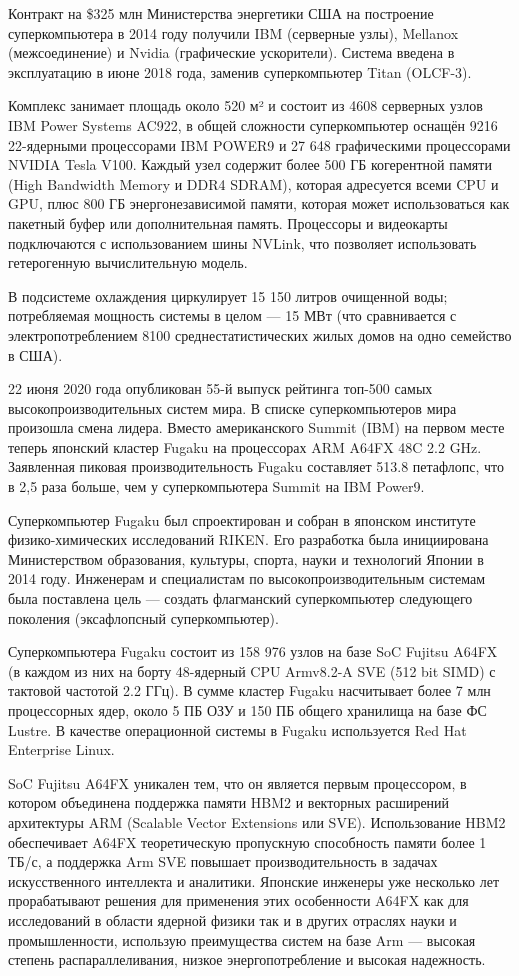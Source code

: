 Контракт на \$325 млн Министерства энергетики США на построение суперкомпьютера в 2014 году получили IBM (серверные узлы), Mellanox (межсоединение) и Nvidia (графические ускорители). Система введена в эксплуатацию в июне 2018 года, заменив суперкомпьютер Titan (OLCF-3).

Комплекс занимает площадь около 520 м² и состоит из 4608 серверных узлов IBM Power Systems AC922, в общей сложности суперкомпьютер оснащён 9216 22-ядерными процессорами IBM POWER9 и 27 648 графическими процессорами NVIDIA Tesla V100. Каждый узел содержит более 500 ГБ когерентной памяти (High Bandwidth Memory и DDR4 SDRAM), которая адресуется всеми CPU и GPU, плюс 800 ГБ энергонезависимой памяти, которая может использоваться как пакетный буфер или дополнительная память. Процессоры и видеокарты подключаются с использованием шины NVLink, что позволяет использовать гетерогенную вычислительную модель.

В подсистеме охлаждения циркулирует 15 150 литров очищенной воды; потребляемая мощность системы в целом — 15 МВт (что сравнивается с электропотреблением 8100 среднестатистических жилых домов на одно семейство в США). 

22 июня 2020 года опубликован 55-й выпуск рейтинга топ-500 самых высокопроизводительных систем мира. В списке суперкомпьютеров мира произошла смена лидера. Вместо американского Summit (IBM) на первом месте теперь японский кластер Fugaku на процессорах ARM A64FX 48C 2.2 GHz. Заявленная пиковая производительность Fugaku составляет 513.8 петафлопс, что в 2,5 раза больше, чем у суперкомпьютера Summit на IBM Power9.

Суперкомпьютер Fugaku был спроектирован и собран в японском институте физико-химических исследований RIKEN. Его разработка была инициирована Министерством образования, культуры, спорта, науки и технологий Японии в 2014 году. Инженерам и специалистам по высокопроизводительным системам была поставлена цель — создать флагманский суперкомпьютер следующего поколения (эксафлопсный суперкомпьютер).

Суперкомпьютера Fugaku состоит из 158 976 узлов на базе SoC Fujitsu A64FX (в каждом из них на борту 48-ядерный CPU Armv8.2-A SVE (512 bit SIMD) с тактовой частотой 2.2 ГГц). В сумме кластер Fugaku насчитывает более 7 млн процессорных ядер, около 5 ПБ ОЗУ и 150 ПБ общего хранилища на базе ФС Lustre. В качестве операционной системы в Fugaku используется Red Hat Enterprise Linux. 

SoC Fujitsu A64FX уникален тем, что он является первым процессором, в котором объединена поддержка памяти HBM2 и векторных расширений архитектуры ARM (Scalable Vector Extensions или SVE). Использование HBM2 обеспечивает A64FX теоретическую пропускную способность памяти более 1 ТБ/с, а поддержка Arm SVE повышает производительность в задачах искусственного интеллекта и аналитики. Японские инженеры уже несколько лет прорабатывают решения для применения этих особенности A64FX как для исследований в области ядерной физики так и в других отраслях науки и промышленности, использую преимущества систем на базе Arm — высокая степень распараллеливания, низкое энергопотребление и высокая надежность.

